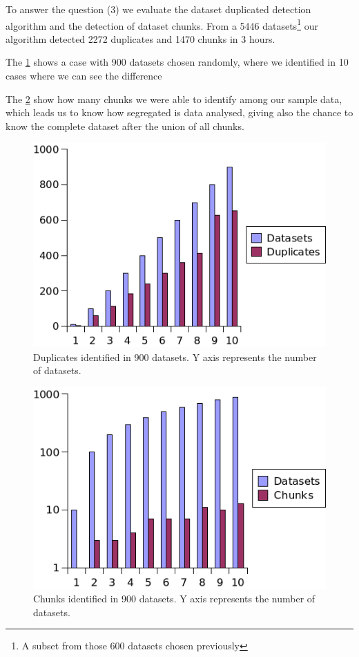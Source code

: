 \documentclass[sw]{iosart2x}
\begin{document}
To answer the question (3) we evaluate the dataset duplicated detection algorithm and the detection of dataset chunks.
From a \num{5446} datasets\footnote{A subset from those 600 datasets chosen previously} our algorithm detected \num{2272} duplicates and \num{1470} chunks in 3 hours.

The \cref{fig:identDuplicates} shows a case with 900 datasets chosen randomly, where we identified in 10 cases where we can see the difference 

The \cref{fig:identChunks} show how many chunks we were able to identify among our sample data, which leads us to know how segregated is data analysed, giving also the chance to know the complete dataset after the union of all chunks.

\begin{figure}[htb] 
	\centering
	\includegraphics[width=\linewidth]{img/DsDuplicate.png}
	\caption{Duplicates identified in 900 datasets. Y axis represents the number of datasets.}
	\label{fig:identDuplicates}
\end{figure}

\begin{figure}[htb] 
	\centering
	\includegraphics[width=\linewidth]{img/DsChunks.png}
	\caption{Chunks identified in 900 datasets. Y axis represents the number of datasets.}
	\label{fig:identChunks}
\end{figure}
\end{document}
